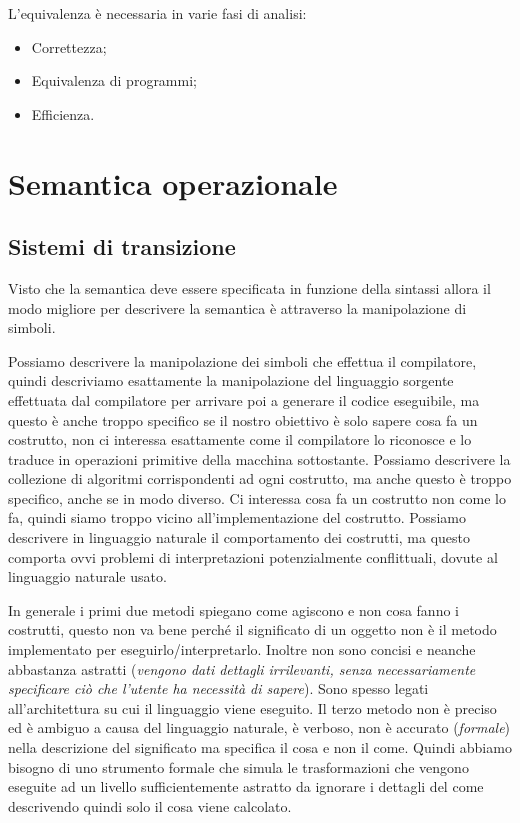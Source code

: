 \documentclass[oneside,a4paper,11pt]{book}
\theoremstyle{italicstyle}
\theoremstyle{normStyle}
\begin{document}
L’equivalenza è necessaria in varie fasi di analisi: 
\begin{itemize}
  \item Correttezza;
  \item Equivalenza di programmi;
  \item Efficienza.
\end{itemize}

\section{Semantica operazionale}
\subsection{Sistemi di transizione}
Visto che la semantica deve essere specificata in funzione della sintassi
allora il modo migliore per descrivere la semantica è attraverso
la manipolazione di simboli.

Possiamo descrivere la manipolazione
dei simboli che effettua il compilatore, quindi descriviamo esattamente
la manipolazione del linguaggio sorgente effettuata dal compilatore per
arrivare poi a generare il codice eseguibile, ma questo è anche troppo
specifico se il nostro obiettivo è solo sapere cosa fa un costrutto,
non ci interessa esattamente come il compilatore lo riconosce e lo
traduce in operazioni primitive della macchina sottostante. Possiamo
descrivere la collezione di algoritmi corrispondenti ad ogni costrutto,
ma anche questo è troppo specifico, anche se in modo diverso.
Ci interessa cosa fa un costrutto non come lo fa, quindi siamo troppo
vicino all’implementazione del costrutto. Possiamo descrivere in linguaggio
naturale il comportamento dei costrutti, ma questo comporta ovvi
problemi di interpretazioni potenzialmente conflittuali,
dovute al linguaggio naturale usato.

In generale i primi due metodi
spiegano come agiscono e non cosa fanno i costrutti, questo non va
bene perché il significato di un oggetto non è il metodo implementato
per eseguirlo/interpretarlo. Inoltre non sono concisi e neanche
abbastanza astratti (\textit{vengono dati dettagli irrilevanti, senza
necessariamente specificare ciò che l’utente ha necessità di sapere}).
Sono spesso legati all’architettura su cui il linguaggio viene eseguito.
Il terzo metodo non è preciso ed è ambiguo a causa del linguaggio
naturale, è verboso, non è accurato (\textit{formale}) nella descrizione del 
significato ma specifica il cosa e non il come. Quindi abbiamo bisogno
di uno strumento formale che simula le trasformazioni che vengono
eseguite ad un livello sufficientemente astratto da ignorare i dettagli
del come descrivendo quindi solo il cosa viene calcolato.
\end{document}
